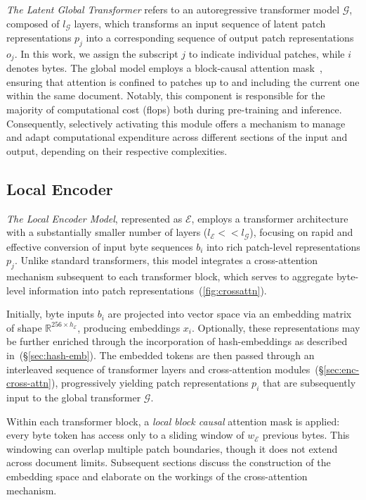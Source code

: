 \textit{The Latent Global Transformer} refers to an autoregressive transformer model $\mathcal{G}$, composed of $l_{\mathcal{G}}$ layers, which transforms an input sequence of latent patch representations $p_j$ into a corresponding sequence of output patch representations $o_j$. In this work, we assign the subscript $j$ to indicate individual patches, while $i$ denotes bytes. The global model employs a block-causal attention mask~\citep{dubey2024llama}, ensuring that attention is confined to patches up to and including the current one within the same document. Notably, this component is responsible for the majority of computational cost (flops) both during pre-training and inference. Consequently, selectively activating this module offers a mechanism to manage and adapt computational expenditure across different sections of the input and output, depending on their respective complexities.

\subsection{Local Encoder}
\label{section:local}

\textit{The Local Encoder Model}, represented as $\mathcal{E}$, employs a transformer architecture with a substantially smaller number of layers ($l_{\mathcal{E}} << l_{\mathcal{G}}$), focusing on rapid and effective conversion of input byte sequences $b_i$ into rich patch-level representations $p_j$. Unlike standard transformers, this model integrates a cross-attention mechanism subsequent to each transformer block, which serves to aggregate byte-level information into patch representations~(\autoref{fig:crossattn}). 

Initially, byte inputs $b_i$ are projected into vector space via an embedding matrix of shape $\mathbb{R}^{256 \times h_{\mathcal{E}}}$, producing embeddings $x_i$. Optionally, these representations may be further enriched through the incorporation of hash-embeddings as described in~(\S\ref{sec:hash-emb}). The embedded tokens are then passed through an interleaved sequence of transformer layers and cross-attention modules~(\S\ref{sec:enc-cross-attn}), progressively yielding patch representations $p_i$ that are subsequently input to the global transformer $\mathcal{G}$. 

Within each transformer block, a \textit{local block causal} attention mask is applied: every byte token has access only to a sliding window of $w_{\mathcal{E}}$ previous bytes. This windowing can overlap multiple patch boundaries, though it does not extend across document limits. Subsequent sections discuss the construction of the embedding space and elaborate on the workings of the cross-attention mechanism.

